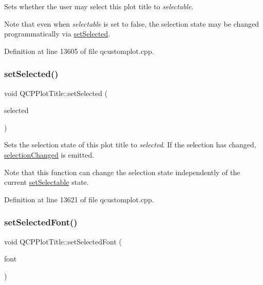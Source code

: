 Sets whether the user may select this plot title to {\itshape selectable}.

Note that even when {\itshape selectable} is set to {\ttfamily false}, the selection state may be changed programmatically via \hyperlink{class_q_c_p_plot_title_a8d441a889d371307df86f1ab7687a333}{set\+Selected}. 

Definition at line 13605 of file qcustomplot.\+cpp.

\mbox{\label{class_q_c_p_plot_title_a8d441a889d371307df86f1ab7687a333}} 
\subsubsection{\texorpdfstring{set\+Selected()}{setSelected()}}
{\footnotesize\ttfamily void Q\+C\+P\+Plot\+Title\+::set\+Selected (\begin{DoxyParamCaption}\item[{bool}]{selected }\end{DoxyParamCaption})}

Sets the selection state of this plot title to {\itshape selected}. If the selection has changed, \hyperlink{class_q_c_p_plot_title_a3a01ede2da3b0b5eda33aa5274cc3523}{selection\+Changed} is emitted.

Note that this function can change the selection state independently of the current \hyperlink{class_q_c_p_plot_title_a8866b07b9fa14877d4cefbf38406c5dd}{set\+Selectable} state. 

Definition at line 13621 of file qcustomplot.\+cpp.

\mbox{\label{class_q_c_p_plot_title_a5245980ead999ceed51dbe702d0e3131}} 
\subsubsection{\texorpdfstring{set\+Selected\+Font()}{setSelectedFont()}}
{\footnotesize\ttfamily void Q\+C\+P\+Plot\+Title\+::set\+Selected\+Font (\begin{DoxyParamCaption}\item[{const Q\+Font \&}]{font }\end{DoxyParamCaption})}


